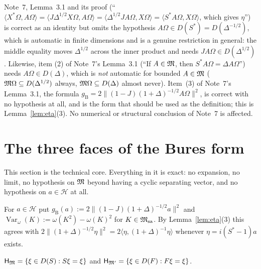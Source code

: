 \documentclass[11pt]{article}
\newcommand{\Om}{\Omega}
\newcommand{\Hil}{\mathcal H}
\newcommand{\Msa}{\cM_{\mathrm{sa}}}
\newcommand{\HM}{\mathsf H_{\cM}}
\newcommand{\HMp}{\mathsf H_{\cM'}}
\newcommand{\Var}{\operatorname{Var}}
\newcommand{\gB}{g_{\mathrm B}}
\newcommand{\ip}[2]{\langle #1,#2\rangle}
\newcommand{\norm}[1]{\lVert #1\rVert}
\begin{document}
\begin{verdictgap}
Note~7, Lemma~3.1 and its proof (``$\ip{X^*\Om}{A\Om}=\ip{J\Delta^{1/2}X\Om}{A\Om}=\ip{\Delta^{1/2}JA\Om}{X\Om}
=\ip{S^*A\Om}{X\Om}$, which gives $\eta$'') is correct as an identity but omits the hypothesis
$A\Om\in D(S^*)=D(\Delta^{-1/2})$, which is automatic in finite dimensions and is a genuine restriction in general:
the middle equality moves $\Delta^{1/2}$ across the inner product and needs $JA\Om\in D(\Delta^{1/2})$.
Likewise, item (2) of Note~7's Lemma~3.1 (``If $A\in\mathfrak M$, then $S^*A\Om=\Delta A\Om$'') needs $A\Om\in D(\Delta)$,
which is \emph{not} automatic for bounded $A\in\mathfrak M$ ($\cM\Om\subseteq D(\Delta^{1/2})$ always, $\cM\Om\subseteq D(\Delta)$
almost never).  Item~(3) of Note~7's Lemma~3.1, the formula
$\gB=2\norm{(1-J)(1+\Delta)^{-1/2}A\Om}^2$, is correct with no hypothesis at all, and is the form that should be used
as the definition; this is Lemma~\ref{lem:eta}(3).  No numerical or structural conclusion of Note~7 is affected.
\end{verdictgap}

\section{The three faces of the Bures form}\label{sec:three}

This section is the technical core.  Everything in it is exact: no expansion, no limit, no hypothesis on $\mathfrak M$
beyond having a cyclic separating vector, and no hypothesis on $a\in\Hil$ at all.

\begin{definition}\label{def:gB}
For $a\in\Hil$ put $\displaystyle \gB(a):=2\bigl\|(1-J)(1+\Delta)^{-1/2}a\bigr\|^2$ and
$\Var_\omega(K):=\omega(K^2)-\omega(K)^2$ for $K\in\Msa$.  By Lemma~\ref{lem:eta}(3) this agrees with
$2\norm{(1+\Delta)^{-1/2}\eta}^2=2\ip{\eta}{(1+\Delta)^{-1}\eta}$ whenever $\eta=i(S^*-1)a$ exists.
\end{definition}

\begin{lemma}\label{lem:realsub}
$\HM=\{\xi\in D(S):S\xi=\xi\}$ and $\HMp=\{\xi\in D(F):F\xi=\xi\}$.
\end{lemma}
\end{document}
